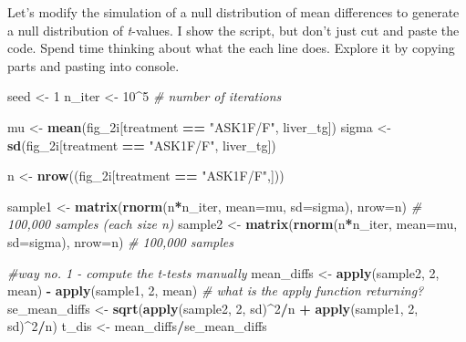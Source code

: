 \documentclass[]{book}
\newenvironment{Shaded}{\begin{snugshade}}{\end{snugshade}}
\newcommand{\CommentTok}[1]{\textcolor[rgb]{0.56,0.35,0.01}{\textit{#1}}}
\newcommand{\DataTypeTok}[1]{\textcolor[rgb]{0.13,0.29,0.53}{#1}}
\newcommand{\DecValTok}[1]{\textcolor[rgb]{0.00,0.00,0.81}{#1}}
\newcommand{\KeywordTok}[1]{\textcolor[rgb]{0.13,0.29,0.53}{\textbf{#1}}}
\newcommand{\NormalTok}[1]{#1}
\newcommand{\OperatorTok}[1]{\textcolor[rgb]{0.81,0.36,0.00}{\textbf{#1}}}
\newcommand{\StringTok}[1]{\textcolor[rgb]{0.31,0.60,0.02}{#1}}
\begin{document}
Let's modify the simulation of a null distribution of mean differences to generate a null distribution of \emph{t}-values. I show the script, but don't just cut and paste the code. Spend time thinking about what the each line does. Explore it by copying parts and pasting into console.

\begin{Shaded}
\begin{Highlighting}[]
\NormalTok{seed <-}\StringTok{ }\DecValTok{1}
\NormalTok{n_iter <-}\StringTok{ }\DecValTok{10}\OperatorTok{^}\DecValTok{5} \CommentTok{# number of iterations}

\NormalTok{mu <-}\StringTok{ }\KeywordTok{mean}\NormalTok{(fig_2i[treatment }\OperatorTok{==}\StringTok{ "ASK1F/F"}\NormalTok{, liver_tg]) }
\NormalTok{sigma <-}\StringTok{ }\KeywordTok{sd}\NormalTok{(fig_2i[treatment }\OperatorTok{==}\StringTok{ "ASK1F/F"}\NormalTok{, liver_tg])}

\NormalTok{n <-}\StringTok{ }\KeywordTok{nrow}\NormalTok{((fig_2i[treatment }\OperatorTok{==}\StringTok{ "ASK1F/F"}\NormalTok{,]))}

\NormalTok{sample1 <-}\StringTok{ }\KeywordTok{matrix}\NormalTok{(}\KeywordTok{rnorm}\NormalTok{(n}\OperatorTok{*}\NormalTok{n_iter, }\DataTypeTok{mean=}\NormalTok{mu, }\DataTypeTok{sd=}\NormalTok{sigma), }\DataTypeTok{nrow=}\NormalTok{n) }\CommentTok{# 100,000 samples (each size n)}
\NormalTok{sample2 <-}\StringTok{ }\KeywordTok{matrix}\NormalTok{(}\KeywordTok{rnorm}\NormalTok{(n}\OperatorTok{*}\NormalTok{n_iter, }\DataTypeTok{mean=}\NormalTok{mu, }\DataTypeTok{sd=}\NormalTok{sigma), }\DataTypeTok{nrow=}\NormalTok{n) }\CommentTok{# 100,000 samples}

\CommentTok{#way no. 1 - compute the t-tests manually}
\NormalTok{mean_diffs <-}\StringTok{ }\KeywordTok{apply}\NormalTok{(sample2, }\DecValTok{2}\NormalTok{, mean) }\OperatorTok{-}\StringTok{ }\KeywordTok{apply}\NormalTok{(sample1, }\DecValTok{2}\NormalTok{, mean) }\CommentTok{# what is the apply function returning?}
\NormalTok{se_mean_diffs <-}\StringTok{ }\KeywordTok{sqrt}\NormalTok{(}\KeywordTok{apply}\NormalTok{(sample2, }\DecValTok{2}\NormalTok{, sd)}\OperatorTok{^}\DecValTok{2}\OperatorTok{/}\NormalTok{n }\OperatorTok{+}\StringTok{ }\KeywordTok{apply}\NormalTok{(sample1, }\DecValTok{2}\NormalTok{, sd)}\OperatorTok{^}\DecValTok{2}\OperatorTok{/}\NormalTok{n)}
\NormalTok{t_dis <-}\StringTok{ }\NormalTok{mean_diffs}\OperatorTok{/}\NormalTok{se_mean_diffs}


\end{Highlighting}
\end{Shaded}
\end{document}
